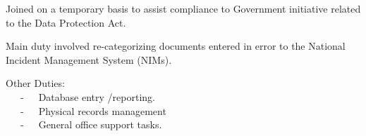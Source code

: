 \begin{cventries}
{\begin{cvitems}
        \item {Joined on a temporary basis to assist compliance to Government initiative related to the Data Protection Act.}
        \item {Main duty involved re-categorizing documents entered in error to the National Incident Management System (NIMs).}
        \item {Other Duties: {\\}~~~-~~~Database entry /reporting.{\\}~~~-~~~Physical records management{\\}~~~-~~~General office support tasks. 	}
      \end{cvitems}
    }
\end{cventries}
